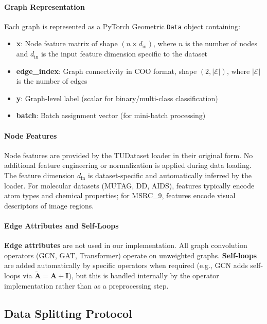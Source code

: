 \paragraph{Graph Representation}
Each graph is represented as a PyTorch Geometric \texttt{Data} object containing:
\begin{itemize}
    \item \textbf{x}: Node feature matrix of shape $(n \times d_{\text{in}})$, where $n$ is the number of nodes and $d_{\text{in}}$ is the input feature dimension specific to the dataset
    \item \textbf{edge\_index}: Graph connectivity in COO format, shape $(2, |\mathcal{E}|)$, where $|\mathcal{E}|$ is the number of edges
    \item \textbf{y}: Graph-level label (scalar for binary/multi-class classification)
    \item \textbf{batch}: Batch assignment vector (for mini-batch processing)
\end{itemize}

\paragraph{Node Features}
Node features are provided by the TUDataset loader in their original form. No additional feature engineering or normalization is applied during data loading. The feature dimension $d_{\text{in}}$ is dataset-specific and automatically inferred by the loader. For molecular datasets (MUTAG, DD, AIDS), features typically encode atom types and chemical properties; for MSRC\_9, features encode visual descriptors of image regions.

\paragraph{Edge Attributes and Self-Loops}
\textbf{Edge attributes} are not used in our implementation. All graph convolution operators (GCN, GAT, Transformer) operate on unweighted graphs. \textbf{Self-loops} are added automatically by specific operators when required (e.g., GCN adds self-loops via $\tilde{\mathbf{A}} = \mathbf{A} + \mathbf{I}$), but this is handled internally by the operator implementation rather than as a preprocessing step.

\subsection{Data Splitting Protocol}

